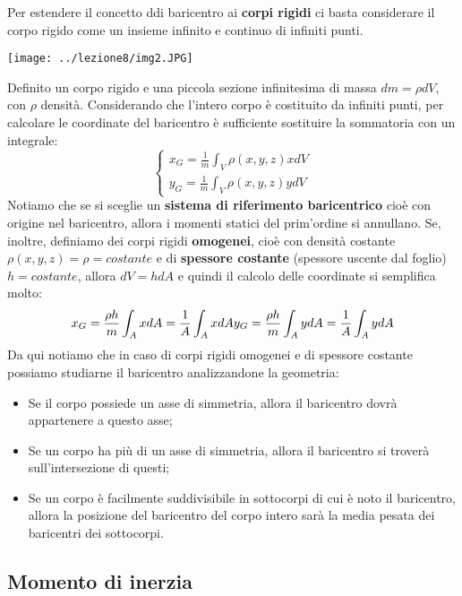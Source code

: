 Per estendere il concetto ddi baricentro ai \textbf{corpi rigidi} ci basta considerare il corpo rigido come un insieme infinito e continuo di infiniti punti.\newline
{}
\begin{center}
    \texttt{[image: ../lezione8/img2.JPG]}
\end{center}
Definito un corpo rigido e una piccola sezione infinitesima di massa $dm = \rho dV $, con $\rho$ densità. Considerando che l'intero corpo è costituito da infiniti punti, per calcolare le coordinate del baricentro è sufficiente sostituire la sommatoria con un integrale:
\[
    \begin{cases}
        x_G = \frac{1}{m} \int_V \rho (x,y,z) x dV\\
        y_G = \frac{1}{m} \int_V \rho(x,y,z) y dV
    \end{cases}
\]
Notiamo che se si sceglie un \textbf{sistema di riferimento baricentrico} cioè con origine nel baricentro, allora i momenti statici del prim'ordine si annullano.\newline
\newline
Se, inoltre, definiamo dei corpi rigidi \textbf{omogenei}, cioè con densità costante $\rho(x,y,z) = \rho = costante$ e di \textbf{spessore costante} (spessore uscente dal foglio) $h = costante$, allora $dV = h dA$ e quindi il calcolo delle coordinate si semplifica molto:
\[
    x_G = \frac{\rho h}{m} \int_{A} x dA = \frac{1}{A} \int_{A} x dA\\
    y_G = \frac{\rho h}{m} \int_{A} y dA = \frac{1}{A} \int_{A} y dA
\]
Da qui notiamo che in caso di corpi rigidi omogenei e di spessore costante possiamo studiarne il baricentro analizzandone la geometria:
\begin{itemize}
    \item Se il corpo possiede un asse di simmetria, allora il baricentro dovrà appartenere a questo asse;
    \item Se un corpo ha più di un asse di simmetria, allora il baricentro si troverà sull'intersezione di questi;
    \item Se un corpo è facilmente suddivisibile in sottocorpi di cui è noto il baricentro, allora la posizione del baricentro del corpo intero sarà la media pesata dei baricentri dei sottocorpi.
\end{itemize}
\subsection{Momento di inerzia}
